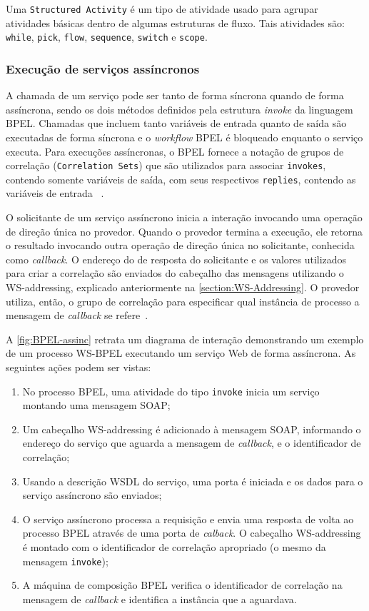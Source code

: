 \documentclass[12pt]{report} %
\begin{document}
		Uma \texttt{Structured Activity} é um tipo de atividade usado para agrupar atividades básicas dentro de algumas estruturas de fluxo.
		Tais atividades são: \texttt{while}, \texttt{pick}, \texttt{flow}, \texttt{sequence}, \texttt{switch} e \texttt{scope}.

	    \subsubsection{Execução de serviços assíncronos}
		A chamada de um serviço pode ser tanto de forma síncrona quando de forma assíncrona, sendo os dois métodos definidos pela estrutura \textit{invoke} da linguagem BPEL.
		Chamadas que incluem tanto variáveis de entrada quanto de saída são executadas de forma síncrona e o \textit{workflow} BPEL é bloqueado enquanto o serviço executa.
		Para execuções assíncronas, o BPEL fornece a notação de grupos de correlação (\texttt{Correlation Sets}) que são utilizados para associar \texttt{invokes}, contendo somente variáveis de saída, com seus respectivos \texttt{replies}, contendo as variáveis de entrada ~\cite{Emmerich05}.

		O solicitante de um serviço assíncrono inicia a interação invocando uma operação de direção única no provedor.
		Quando o provedor termina a execução, ele retorna o resultado invocando outra operação de direção única no solicitante, conhecida como \textit{callback}.
		O endereço do de resposta do solicitante e os valores utilizados para criar a correlação são enviados do cabeçalho das mensagens utilizando o WS-addressing, explicado anteriormente na \autoref{section:WS-Addressing}.
		O provedor utiliza, então, o grupo de correlação para especificar qual instância de processo a mensagem de \textit{callback} se refere~\cite{Emmerich05}.

		A \autoref{fig:BPEL-assinc} retrata um diagrama de interação demonstrando um exemplo de um processo WS-BPEL executando um serviço Web de forma assíncrona.
		As seguintes ações podem ser vistas:
		
		\begin{enumerate}
		    \item No processo BPEL, uma atividade do tipo \texttt{invoke} inicia um serviço montando uma mensagem SOAP;
		    \item Um cabeçalho WS-addressing é adicionado à mensagem SOAP, informando o endereço do serviço que aguarda a mensagem de \textit{callback}, e o identificador de correlação;
		    \item Usando a descrição WSDL do serviço, uma porta é iniciada e os dados para o serviço assíncrono são enviados;
		    \item O serviço assíncrono processa a requisição e envia uma resposta de volta ao processo BPEL através de uma porta de \textit{calback}.
			O cabeçalho WS-addressing é montado com o identificador de correlação apropriado (o mesmo da mensagem \texttt{invoke});
		    \item A máquina de composição BPEL verifica o identificador de correlação na mensagem de \textit{callback} e identifica a instância que a aguardava.
		\end{enumerate}
		
\end{document}
